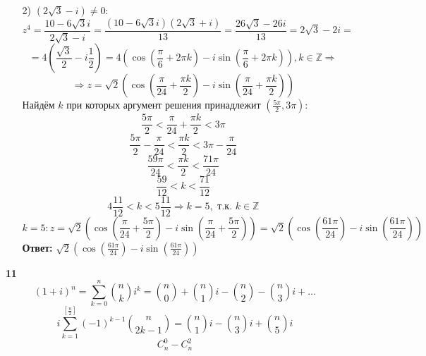 \documentclass[a4paper]{article}
\renewcommand{\f}[2]{\frac{#1}{#2}}
\newcommand{\s}[2]{\sum\limits_{#1}^{#2}}
\renewcommand{\r}{\Rightarrow}
\newcommand{\ZZ}{\mathbb{Z}}
\begin{document}
\begin{enumerate}
\begin{enumerate}
        \item[2)]$(2\sqrt{3}-i) \neq 0:$
        $$z^4 = \f{10-6\sqrt{3}i}{2\sqrt{3}-i}=\f{(10-6\sqrt{3}i)(2\sqrt{3}+i)}{13} = \f{26\sqrt{3} - 26i}{13} = 2\sqrt{3}-2i = $$
        $$ = 4(\f{\sqrt{3}}{2}-i\f{1}{2}) = 4(\cos(\f{\pi}{6} + 2\pi k)-i\sin{(\f{\pi}{6} + 2\pi k)}), k \in \ZZ \r$$
        $$\r z = \sqrt{2}(\cos(\f{\pi}{24} + \f{\pi k}{2})-i\sin(\f{\pi}{24} + \f{\pi k}{2}))$$
        Найдём $k$ при которых аргумент решения принадлежит $(\f{5\pi}{2}, 3\pi)$:
        $$\f{5\pi}{2}< \f{\pi}{24} + \f{\pi k}{2} < 3\pi$$
        $$\f{5\pi}{2}-\f{\pi}{24}< \f{\pi k}{2} < 3\pi-\f{\pi}{24}$$
        $$\f{59\pi}{24}<\f{\pi k}{2} < \f{71\pi}{24}$$
        $$\f{59}{12}<k< \f{71}{12}$$
        $$4\f{11}{12}<k< 5\f{11}{12} \r k = 5, \text{ т.к. } k \in \ZZ$$
        $$k = 5: z = \sqrt{2}(\cos(\f{\pi}{24} + \f{5\pi}{2})-i\sin(\f{\pi}{24} + \f{5\pi}{2})) = \sqrt{2}(\cos(\f{61\pi}{24})-i\sin(\f{61\pi}{24}))$$
        \textbf{Ответ: } $\sqrt{2}(\cos(\f{61\pi}{24})-i\sin(\f{61\pi}{24}))$
    \end{enumerate}

    \item[\textbf{11}]$$(1+i)^n = \s{k=0}{n}\binom{n}{k}i^k = \binom{n}{0} + \binom{n}{1}i - \binom{n}{2} - \binom{n}{3}i+ \dots$$
    $$i\s{k=1}{[\f{n}{2}]}(-1)^{k-1}\binom{n}{2k-1} = \binom{n}{1}i - \binom{n}{3}i+\binom{n}{5}i$$
    $$C_n^0 - C_n^2$$
\end{enumerate}
\end{document}

